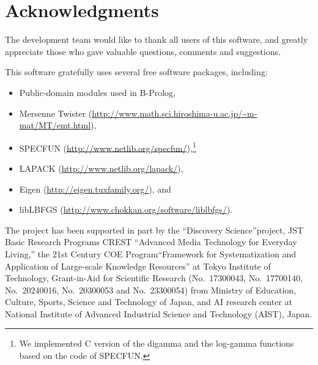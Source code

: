 \documentclass[a4paper]{report}
\begin{document}
\section*{Acknowledgments}


The development team would like to thank all users of this software,
and greatly appreciate those who gave valuable questions, comments and
suggestions.

This software gratefully uses several free software packages, including:
%
\begin{itemize}
\setlength{\parskip}{0pt}
\setlength{\itemsep}{2pt}
\item
  Public-domain modules used in B-Prolog,
\item
  Mersenne Twister
  (\url{http://www.math.sci.hiroshima-u.ac.jp/~m-mat/MT/emt.html}),
\item
  SPECFUN (\url{http://www.netlib.org/specfun/}),\footnote{
    We implemented C version of the digamma and the log-gamma functions
    based on the code of SPECFUN.
  }
\item
  LAPACK (\url{http://www.netlib.org/lapack/}),
\item
  Eigen (\url{http://eigen.tuxfamily.org/}), and
\item
  libLBFGS
  (\url{http://www.chokkan.org/software/liblbfgs/}).
\end{itemize}


The project has been supported in part by
the ``Discovery Science''project,
JST Basic Research Programs CREST ``Advanced Media Technology for Everyday Living,''
the 21st Century COE Program``Framework for Systematization and Application of Large-scale
Knowledge Resources'' at Tokyo  Institute of Technology,
Grant-in-Aid for Scientific Research (No.~17300043, No.~17700140, No.~20240016,
No.~20300053 and No.~23300054) from Ministry of Education, Culture, Sports,
Science and Technology of Japan,
and
AI research center at
National Institute of Advanced Industrial Science and Technology (AIST), Japan.
\end{document}
